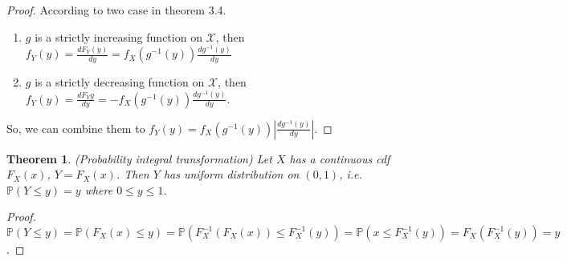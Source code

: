 \documentclass[11pt]{article}
\def\BP{{\bf P}}
\def\BP{{\mathbb P}}
\newtheorem{theorem}{Theorem}[section]
\begin{document}
\begin{proof}
According to two case in theorem 3.4. 
\begin{enumerate}
\item $g$ is a strictly increasing function on $\mathcal{X}$, then 
$f_Y(y) = \frac{dF_Y(y)}{dy} = f_X(g^{-1}(y)) \frac{dg^{-1}(y)}{dy}$
\item $g$ is a strictly decreasing function on $\mathcal{X}$, then 
$f_Y(y) = \frac{dF_Y{y}}{dy} =-f_X(g^{-1}(y))\frac{dg^{-1}(y)}{dy}$.
\end{enumerate}
So, we can combine them to $f_Y(y) = f_X(g^{-1}(y)) |\frac{dg^{-1}(y)}{dy}|$.
\end{proof}

\begin{theorem}(Probability integral transformation)
Let $X$ has a continuous cdf $F_X(x)$, $Y=F_X(x)$. Then $Y$ has uniform distribution on $(0, 1)$, i.e. $\BP(Y \leq y) = y$ where $0 \leq y \leq 1$.
\end{theorem}

\begin{proof}
$\BP(Y \leq y) = \BP(F_X(x) \leq y) = \BP(F_X^{-1}(F_X(x)) \leq F_X^{-1}(y)) = \BP(x \leq F_X^{-1}(y)) = F_X(F_X^{-1}(y)) = y$.
\end{proof}
\end{document}
